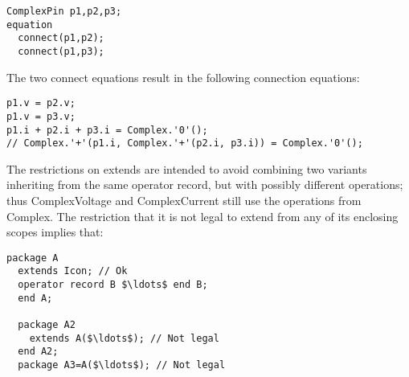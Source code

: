 \begin{example}
\begin{lstlisting}[language=modelica]
  ComplexPin p1,p2,p3;
equation
  connect(p1,p2);
  connect(p1,p3);
\end{lstlisting}
The two connect equations result in the following connection
equations:
\begin{lstlisting}[language=modelica]
p1.v = p2.v;
p1.v = p3.v;
p1.i + p2.i + p3.i = Complex.'0'();
// Complex.'+'(p1.i, Complex.'+'(p2.i, p3.i)) = Complex.'0'();
\end{lstlisting}
The restrictions on extends are intended to avoid combining two
variants inheriting from the same operator record, but with possibly
different operations; thus ComplexVoltage and ComplexCurrent still use
the operations from Complex. The restriction that it is not legal to
extend from any of its enclosing scopes implies that:
\begin{lstlisting}[language=modelica]
package A
  extends Icon; // Ok
  operator record B $\ldots$ end B;
  end A;

  package A2
    extends A($\ldots$); // Not legal
  end A2;
  package A3=A($\ldots$); // Not legal
\end{lstlisting}
\end{example}
